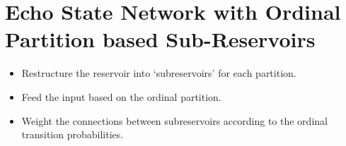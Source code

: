
\chapter{Echo State Network with Ordinal Partition based Sub-Reservoirs}

\begin{itemize}
    \item Restructure the reservoir into `subreservoirs' for each partition.
    \item Feed the input based on the ordinal partition.
    \item Weight the connections between subreservoirs according to the ordinal transition probabilities.
\end{itemize}

